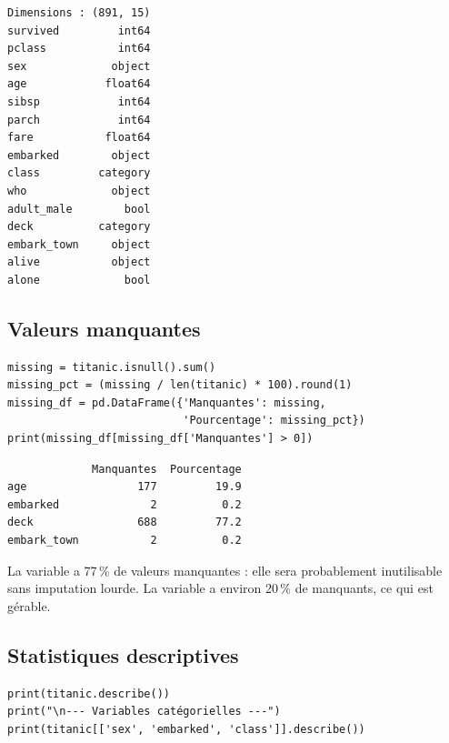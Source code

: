 \begin{codeoutput}
\begin{verbatim}
Dimensions : (891, 15)
survived         int64
pclass           int64
sex             object
age            float64
sibsp            int64
parch            int64
fare           float64
embarked        object
class         category
who             object
adult_male        bool
deck          category
embark_town     object
alive           object
alone             bool
\end{verbatim}
\end{codeoutput}

\subsection{Valeurs manquantes}

\begin{codeblock}[title=\textbf{Python}]
\begin{verbatim}
missing = titanic.isnull().sum()
missing_pct = (missing / len(titanic) * 100).round(1)
missing_df = pd.DataFrame({'Manquantes': missing,
                           'Pourcentage': missing_pct})
print(missing_df[missing_df['Manquantes'] > 0])
\end{verbatim}
\end{codeblock}

\begin{codeoutput}
\begin{verbatim}
             Manquantes  Pourcentage
age                 177         19.9
embarked              2          0.2
deck                688         77.2
embark_town           2          0.2
\end{verbatim}
\end{codeoutput}

\begin{remarque}
La variable  a 77\,\% de valeurs manquantes : elle sera probablement inutilisable sans imputation lourde. La variable  a environ 20\,\% de manquants, ce qui est g\'erable.
\end{remarque}

\subsection{Statistiques descriptives}

\begin{codeblock}[title=\textbf{Python}]
\begin{verbatim}
print(titanic.describe())
print("\n--- Variables catégorielles ---")
print(titanic[['sex', 'embarked', 'class']].describe())
\end{verbatim}
\end{codeblock}

